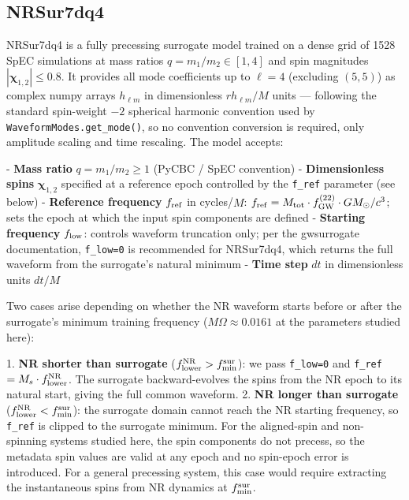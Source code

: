 \documentclass[%
 reprint,
superscriptaddress,
 amsmath,amssymb,
 aps,
]{revtex4-2}
\begin{document}
\subsection{NRSur7dq4}

NRSur7dq4 \cite{Varma:2019csw, Varma:2018aht} is a fully precessing surrogate model trained on a dense grid of 1528 SpEC simulations at mass ratios $q = m_1/m_2 \in [1, 4]$ and spin magnitudes $|\boldsymbol{\chi}_{1,2}| \leq 0.8$. It provides all mode coefficients up to $\ell = 4$ (excluding $(5,5)$) as complex numpy arrays $h_{\ell m}$ in dimensionless $r h_{\ell m}/M$ units — following the standard spin-weight $-2$ spherical harmonic convention used by \texttt{WaveformModes.get\_mode()}, so no convention conversion is required, only amplitude scaling and time rescaling. The model accepts:

- \textbf{Mass ratio} $q = m_1/m_2 \geq 1$ (PyCBC / SpEC convention)
- \textbf{Dimensionless spins} $\boldsymbol{\chi}_{1,2}$ specified at a reference epoch controlled by the \texttt{f\_ref} parameter (see below)
- \textbf{Reference frequency} $f_{\rm ref}$ in cycles/$M$: $f_{\rm ref} = M_{\rm tot} \cdot f_{\rm GW}^{(22)} \cdot G M_\odot / c^3$; sets the epoch at which the input spin components are defined
- \textbf{Starting frequency} $f_{\rm low}$: controls waveform truncation only; per the gwsurrogate documentation, \texttt{f\_low=0} is recommended for NRSur7dq4, which returns the full waveform from the surrogate's natural minimum
- \textbf{Time step} $dt$ in dimensionless units $dt/M$

Two cases arise depending on whether the NR waveform starts before or after the surrogate's minimum training frequency ($M\Omega \approx 0.0161$ at the parameters studied here):

1. \textbf{NR shorter than surrogate} ($f_{\rm lower}^{\rm NR} > f_{\rm min}^{\rm sur}$): we pass \texttt{f\_low=0} and \texttt{f\_ref}$= M_s \cdot f_{\rm lower}^{\rm NR}$. The surrogate backward-evolves the spins from the NR epoch to its natural start, giving the full common waveform.
2. \textbf{NR longer than surrogate} ($f_{\rm lower}^{\rm NR} < f_{\rm min}^{\rm sur}$): the surrogate domain cannot reach the NR starting frequency, so \texttt{f\_ref} is clipped to the surrogate minimum. For the aligned-spin and non-spinning systems studied here, the spin components do not precess, so the metadata spin values are valid at any epoch and no spin-epoch error is introduced. For a general precessing system, this case would require extracting the instantaneous spins from NR dynamics at $f_{\rm min}^{\rm sur}$.
\end{document}
